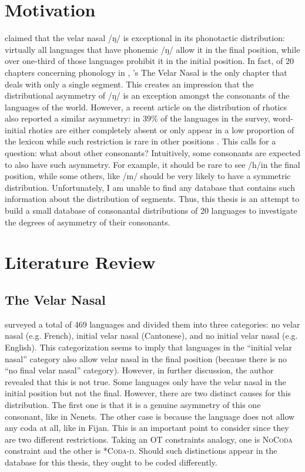 \section{Motivation}

\citet{wals-9} claimed that the velar nasal  /ŋ/ is exceptional in its phonotactic distribution: virtually all languages that have phonemic /ŋ/ allow it in the final position, while over one-third of those languages prohibit it in the initial position. In fact, of 20 chapters concerning phonology in \citet{wals}, \citeauthor{wals-9}'s The Velar Nasal is the only chapter that deals with only a single segment. This creates an impression that the distributional asymmetry of /ŋ/ is an exception amongst the consonants of the languages of the world. However, a recent article on the distribution of rhotics also reported a similar asymmetry: in 39\% of the languages in the survey, word-initial rhotics are either completely absent or only appear in a low proportion of the lexicon while such restriction is rare in other positions \citep{labrune2021word}. This calls for a question: what about other consonants? Intuitively, some consonants are expected to also have such asymmetry. For example, it should be rare to see /h/in the final position, while some others, like /m/ should be very likely to have a symmetric distribution. Unfortunately, I am unable to find any database that contains such information about the distribution of segments. Thus, this thesis is an attempt to build a small database of consonantal distributions of 20 languages to investigate the degrees of asymmetry of their consonants.

\section{Literature Review}

\subsection{The Velar Nasal}

\citet{wals-9} surveyed a total of 469 languages and divided them into three categories: no velar nasal (e.g. French), initial velar nasal (Cantonese), and no initial velar nasal (e.g. English). This categorization seems to imply that languages in the ``initial velar nasal'' category also allow velar nasal in the final position (because there is no ``no final velar nasal'' category). However, in further discussion, the author revealed that this is not true. Some languages only have the velar nasal in the initial position but not the final. However, there are two distinct causes for this distribution. The first one is that it is a genuine asymmetry of this one consonant, like in Nenets. The other case is because the language does not allow any coda at all, like in Fijan. This is an important point to consider since they are two different restrictions. Taking an OT constraints analogy, one is \textsc{NoCoda} constraint and the other is \textsc{*Coda-ŋ}. Should such distinctions appear in the database for this thesis, they ought to be coded differently.

